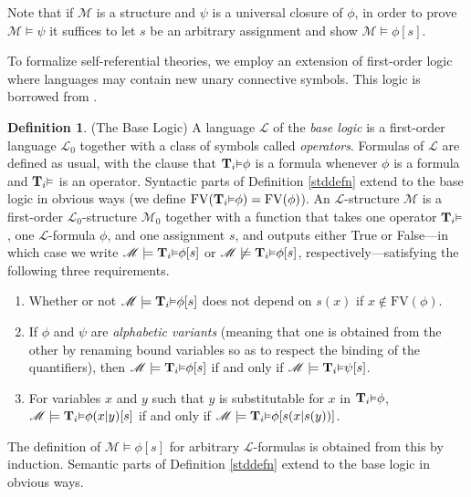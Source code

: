 \documentclass[reqno]{article}
\theoremstyle{definition}
\newtheorem{definition}[theorem]{Definition}
\def\L{\mathscr{L}}
\def\M{\mathscr{M}}
\def\T{\mathbf{T}}
\def\FV{\mathrm{FV}}
\renewcommand{\Pr}[1]{\T_{#1}\mbox{\small${\vDash}$}}
\begin{document}
Note that if $\M$ is a structure and $\psi$ is a universal closure of 
$\phi$, in order to prove $\M\models\psi$ it suffices to let $s$ be an 
arbitrary assignment and show $\M\models\phi[s]$.

To formalize self-referential theories, we employ an extension of
first-order logic where languages may contain new unary connective symbols.
This logic is borrowed from \cite{carlson2000}.

\begin{definition}
\label{baselogicdefn}
(The Base Logic)
A language $\L$ of the \emph{base logic} is a first-order language $\L_0$ together with
a class of symbols called \emph{operators}.
Formulas of $\L$ are defined as usual, with the clause that
$\Pr{i}\phi$ is a formula whenever $\phi$ is a formula and $\Pr{i}$
is an operator.
Syntactic parts of Definition \ref{stddefn} extend to the base logic in obvious
ways (we define $\FV(\Pr{i}\phi)=\FV(\phi)$).
An $\L$-structure $\M$ is a first-order $\L_0$-structure $\M_0$
together with a function that takes one operator $\Pr{i}$, one $\L$-formula
$\phi$, and one assignment $s$, and outputs either True or False---in which case we
write $\M\models\Pr{i}\phi[s]$ or $\M\not\models\Pr{i}\phi[s]$, respectively---satisfying
the following three requirements.
\begin{enumerate}
\item Whether or not $\M\models\Pr{i}\phi[s]$ does not depend on $s(x)$ if $x\not\in \FV(\phi)$.
\item If $\phi$ and $\psi$ are \emph{alphabetic variants}
(meaning
that one is obtained from the other by renaming bound variables so as to respect the binding of
the quantifiers), then $\M\models\Pr{i}\phi[s]$ if and only if $\M\models\Pr{i}\psi[s]$.
\item For variables $x$ and $y$ such that $y$ is substitutable for $x$
in $\Pr{i}\phi$, $\M\models\Pr{i}\phi(x|y)[s]$ if and only if $\M\models \Pr{i}\phi[s(x|s(y))]$.
\end{enumerate}
The definition of $\M\models\phi[s]$ for arbitrary $\L$-formulas is obtained from this by induction.
Semantic parts of Definition \ref{stddefn} extend to the base logic in obvious ways.
\end{definition}
\end{document}
